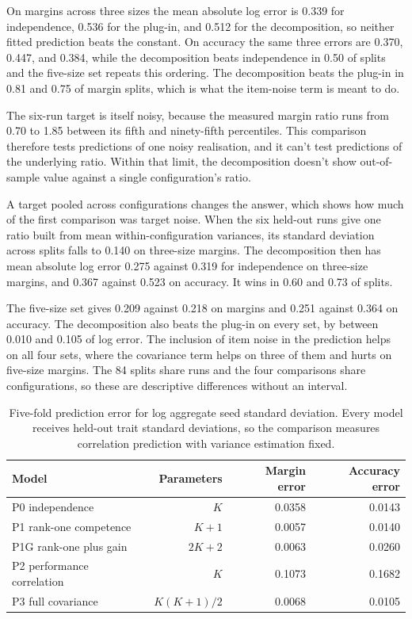 On margins across three sizes the mean absolute log error is 0.339 for independence, 0.536 for the plug-in, and 0.512 for the decomposition, so neither fitted prediction beats the constant. On accuracy the same three errors are 0.370, 0.447, and 0.384, while the decomposition beats independence in 0.50 of splits and the five-size set repeats this ordering. The decomposition beats the plug-in in 0.81 and 0.75 of margin splits, which is what the item-noise term is meant to do.

The six-run target is itself noisy, because the measured margin ratio runs from 0.70 to 1.85 between its fifth and ninety-fifth percentiles. This comparison therefore tests predictions of one noisy realisation, and it can't test predictions of the underlying ratio. Within that limit, the decomposition doesn't show out-of-sample value against a single configuration's ratio.

A target pooled across configurations changes the answer, which shows how much of the first comparison was target noise. When the six held-out runs give one ratio built from mean within-configuration variances, its standard deviation across splits falls to 0.140 on three-size margins. The decomposition then has mean absolute log error 0.275 against 0.319 for independence on three-size margins, and 0.367 against 0.523 on accuracy. It wins in 0.60 and 0.73 of splits.

The five-size set gives 0.209 against 0.218 on margins and 0.251 against 0.364 on accuracy. The decomposition also beats the plug-in on every set, by between 0.010 and 0.105 of log error. The inclusion of item noise in the prediction helps on all four sets, where the covariance term helps on three of them and hurts on five-size margins. The 84 splits share runs and the four comparisons share configurations, so these are descriptive differences without an interval.

\begin{table}[!htb]
\centering
\caption{Five-fold prediction error for log aggregate seed standard deviation. Every model receives held-out trait standard deviations, so the comparison measures correlation prediction with variance estimation fixed.}
\label{tab:original11}
\small\setlength{\tabcolsep}{4pt}\renewcommand{\arraystretch}{1.12}
\begin{tabular}{lrrr}\toprule
Model & Parameters & Margin error & Accuracy error\\\midrule
P0 independence & $K$ & 0.0358 & 0.0143\\
P1 rank-one competence & $K+1$ & 0.0057 & 0.0140\\
P1G rank-one plus gain & $2K+2$ & 0.0063 & 0.0260\\
P2 performance correlation & $K$ & 0.1073 & 0.1682\\
P3 full covariance & $K(K+1)/2$ & 0.0068 & 0.0105\\\bottomrule
\end{tabular}
\end{table}


